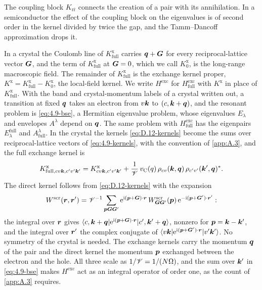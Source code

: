 The coupling block $K_{\mathrm{r}\bar{\mathrm{r}}}$ connects the creation of a pair with its annihilation. In a semiconductor the effect of the coupling block on the eigenvalues is of second order in the kernel divided by twice the gap, and the Tamm--Dancoff approximation drops it.

In a crystal the Coulomb line of $K^{\mathrm{x}}_{\mathrm{full}}$ carries $\bm{q} + \bm{G}$ for every reciprocal-lattice vector $\bm{G}$, and the term of $K^{\mathrm{x}}_{\mathrm{full}}$ at $\bm{G} = 0$, which we call $K^{\mathrm{x}}_0$, is the long-range macroscopic field. The remainder of $K^{\mathrm{x}}_{\mathrm{full}}$ is the exchange kernel proper, $K^{\mathrm{x}} = K^{\mathrm{x}}_{\mathrm{full}} - K^{\mathrm{x}}_0$, the local-field kernel. We write $H^{\mathrm{exc}}$ for $H^{\mathrm{exc}}_{\mathrm{full}}$ with $K^{\mathrm{x}}$ in place of $K^{\mathrm{x}}_{\mathrm{full}}$. With the band and crystal-momentum labels of a crystal written out, a transition at fixed $\bm{q}$ takes an electron from $v\bm{k}$ to $(c,\bm{k}+\bm{q})$, and the resonant problem is \cref{eq:4.9-bse}, a Hermitian eigenvalue problem, whose eigenvalues $E_\lambda$ and envelopes $A^\lambda$ depend on $\bm{q}$. The same problem with $H^{\mathrm{exc}}_{\mathrm{full}}$ has the eigenpairs $E^{\mathrm{full}}_\lambda$ and $A^\lambda_{\mathrm{full}}$. In the crystal the kernels \cref{eq:D.12-kernels} become the sums over reciprocal-lattice vectors of \cref{eq:4.9-kernels}, with the convention of \cref{app:A.3}, and the full exchange kernel is
\begin{equation}
  K^{\mathrm{x}}_{\mathrm{full},cv\bm{k},c'v'\bm{k}'} = K^{\mathrm{x}}_{cv\bm{k},c'v'\bm{k}'} + \frac1{\mathscr{V}}\,v_{\mathrm{C}}(q)\,\rho_{cv}(\bm{k},\bm{q})\,\rho_{c'v'}(\bm{k}',\bm{q})^* .
  \label{eq:D.12-crystal}
\end{equation}
The direct kernel follows from \cref{eq:D.12-kernels} with the expansion
\begin{equation*}
  W^{\mathrm{scr}}(\bm{r},\bm{r}') = \mathscr{V}^{-1}\sum_{\bm{p}\bm{G}\bm{G}'}\mathrm{e}^{\mathrm{i}(\bm{p}+\bm{G})\cdot\bm{r}}\,W^{\mathrm{scr}}_{\bm{G}\bm{G}'}(\bm{p})\,\mathrm{e}^{-\mathrm{i}(\bm{p}+\bm{G}')\cdot\bm{r}'} :
\end{equation*}
the integral over $\bm{r}$ gives $\langle c,\bm{k}+\bm{q}|\mathrm{e}^{\mathrm{i}(\bm{p}+\bm{G})\cdot\bm{r}}|c',\bm{k}'+\bm{q}\rangle$, nonzero for $\bm{p} = \bm{k} - \bm{k}'$, and the integral over $\bm{r}'$ the complex conjugate of $\langle v\bm{k}|\mathrm{e}^{\mathrm{i}(\bm{p}+\bm{G}')\cdot\bm{r}}|v'\bm{k}'\rangle$. No symmetry of the crystal is needed. The exchange kernels carry the momentum $\bm{q}$ of the pair and the direct kernel the momentum $\bm{p}$ exchanged between the electron and the hole. All three scale as $1/\mathscr{V} = 1/(N\Omega)$, and the sum over $\bm{k}'$ in \cref{eq:4.9-bse} makes $H^{\mathrm{exc}}$ act as an integral operator of order one, as the count of \cref{app:A.3} requires.

